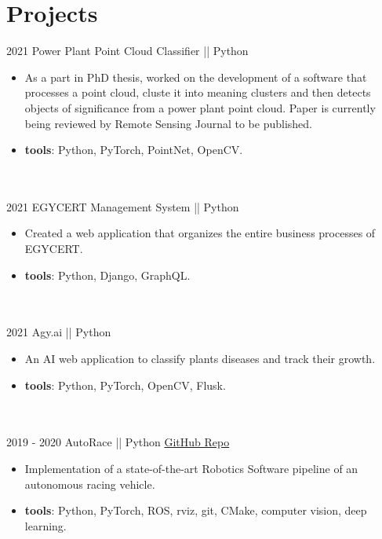 \documentclass[a4paper]{twentysecondcv} %
\begin{document}
\makesidebar %
\vspace{-0.25cm}

\section{Projects }{\faClipboard}
\begin{twenty}
  \twentyitem
  {2021}
  {}
   {Power Plant Point Cloud Classifier || Python}
   {\href{}{}}
   {}
   {\vspace{-2mm}\begin{itemize}[topsep=0pt,partopsep=0pt]
   \item  As a part in PhD thesis, worked on the development of a software that processes a point cloud, cluste it into meaning clusters and then detects objects of significance from a power plant point cloud. Paper is currently being reviewed by Remote Sensing Journal to be published.
   \item \textbf{tools}: Python, PyTorch, PointNet, OpenCV.
  \end{itemize}} \\\\

  \twentyitem
  {2021}
  {}
   {EGYCERT Management System || Python}
   {\href{}{}}
   {}
   {\vspace{-2mm}\begin{itemize}[topsep=0pt,partopsep=0pt]
    \item Created a web application that organizes the entire business processes of EGYCERT.
   \item \textbf{tools}: Python, Django, GraphQL.
  \end{itemize}} \\\\

  \twentyitem
  {2021}
  {}
   {Agy.ai || Python}
   {\href{}{}}
   {}
   {\vspace{-2mm}\begin{itemize}[topsep=0pt,partopsep=0pt]
    \item An AI web application to classify plants diseases and track their growth.
   \item \textbf{tools}: Python, PyTorch, OpenCV, Flusk.
  \end{itemize}} \\\\


 \twentyitem
 {2019 - 2020}
{}
  {AutoRace || Python} 
  {\href{https://github.com/curtfs/CURT-FSAI/}{GitHub Repo}}
  {}
  {\vspace{-2mm}\begin{itemize}[topsep=0pt,partopsep=0pt]
  \item  Implementation of a state-of-the-art Robotics Software pipeline of an autonomous racing vehicle.
  \item \textbf{tools}: Python, PyTorch, ROS, rviz, git, CMake, computer vision, deep learning.
 

\end{itemize}}
\end{twenty}
\end{document}
